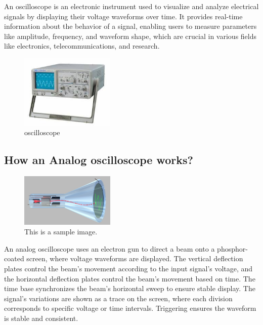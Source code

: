 
An oscilloscope is an electronic instrument used to visualize and analyze electrical signals by displaying their voltage waveforms over time. It provides real-time information about the behavior of a signal, enabling users to measure parameters like amplitude, frequency, and waveform shape, which are crucial in various fields like electronics, telecommunications, and research.

\begin{figure}[h!]
    \centering
    \includegraphics[width=0.4\textwidth]{figures/oscilloscope.jpeg}
    \caption{oscilloscope}
    \label{fig:sample_image}
\end{figure}
 

\subsection{How an Analog oscilloscope works?}
\begin{figure}[h!]
    \centering
    \includegraphics[width=0.4\textwidth]{figures/cathoderay.jpeg}
    \caption{This is a sample image.}
    \label{fig:sample_image}
\end{figure}

An analog oscilloscope uses an electron gun to direct a beam onto a phosphor-coated screen, where voltage waveforms are displayed. The vertical deflection plates control the beam's movement according to the input signal's voltage, and the horizontal deflection plates control the beam's movement based on time. The time base synchronizes the beam's horizontal sweep to ensure stable display. The signal's variations are shown as a trace on the screen, where each division corresponds to specific voltage or time intervals. Triggering ensures the waveform is stable and consistent.
\\

